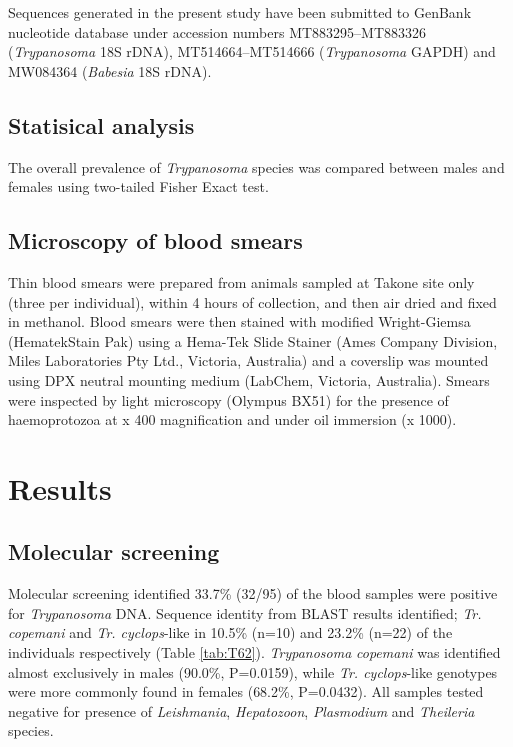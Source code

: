 \documentclass[a4paper, nobind]{templates/ociamthesis}
\begin{document}
Sequences generated in the present study have been submitted to GenBank nucleotide database under accession numbers MT883295--MT883326 (\emph{Trypanosoma} 18S rDNA), MT514664--MT514666 (\emph{Trypanosoma} GAPDH) and MW084364 (\emph{Babesia} 18S rDNA).

\hypertarget{statisical-analysis}{%
\subsection{Statisical analysis}\label{statisical-analysis}}

The overall prevalence of \emph{Trypanosoma} species was compared between males and females using two-tailed Fisher Exact test.

\hypertarget{microscopy-of-blood-smears}{%
\subsection{Microscopy of blood smears}\label{microscopy-of-blood-smears}}

Thin blood smears were prepared from animals sampled at Takone site only (three per individual), within 4 hours of collection, and then air dried and fixed in methanol. Blood smears were then stained with modified Wright-Giemsa (Hematek\textregistered Stain Pak) using a Hema-Tek Slide Stainer (Ames Company Division, Miles Laboratories Pty Ltd., Victoria, Australia) and a coverslip was mounted using DPX neutral mounting medium (LabChem, Victoria, Australia). Smears were inspected by light microscopy (Olympus BX51) for the presence of haemoprotozoa at x 400 magnification and under oil immersion (x 1000).

\hypertarget{results-2}{%
\section{Results}\label{results-2}}

\hypertarget{molecular-screening-1}{%
\subsection{Molecular screening}\label{molecular-screening-1}}

Molecular screening identified 33.7\% (32/95) of the blood samples were positive for \emph{Trypanosoma} DNA. Sequence identity from BLAST results identified; \emph{Tr. copemani} and \emph{Tr. cyclops}-like in 10.5\% (n=10) and 23.2\% (n=22) of the individuals respectively (Table \ref{tab:T62}). \emph{Trypanosoma} \emph{copemani} was identified almost exclusively in males (90.0\%, P=0.0159), while \emph{Tr. cyclops}-like genotypes were more commonly found in females (68.2\%, P=0.0432). All samples tested negative for presence of \emph{Leishmania}, \emph{Hepatozoon}, \emph{Plasmodium} and \emph{Theileria} species.
\end{document}
